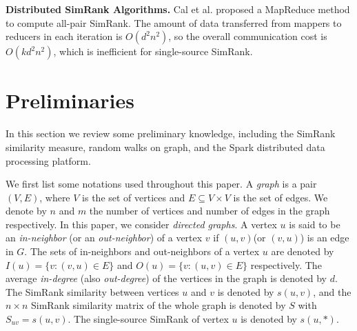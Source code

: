 \documentclass[conference]{IEEEtran}
\theoremstyle{definition}
\theoremstyle{definition}
\begin{document}
 \textbf{Distributed SimRank Algorithms. } 
Cal et al. \cite{cao2012delta} proposed a MapReduce method to compute all-pair SimRank. 
The amount of data transferred from mappers to reducers in each iteration is $O(d^2n^2)$, so the overall communication cost  is $O(kd^2n^2)$, which is inefficient  for single-source SimRank.

\section{Preliminaries}
In this section we review some preliminary knowledge, including the SimRank similarity measure, random walks on graph, and the Spark distributed data processing platform. 

We first list some notations used throughout this paper.
A \emph{graph} is a pair $(V, E)$, where $V$ is the set of vertices and $E \subseteq V \times V$ is the set of edges. 
We denote by $n$ and $m$ the number of vertices and number of edges in the graph respectively. 
In this paper, we consider {\em directed graphs}. 
A vertex $u$ is said to be an {\em in-neighbor} (or an {\em out-neighbor}) of a vertex $v$ if $(u, v)$(or $(v,u)$) is an edge in $G$.
 The sets of in-neighbors and out-neighbors of a vertex $u$ are denoted by $I(u)=\{v: (v, u) \in E\}$ and  $O(u)=\{v: (u, v) \in E\}$ respectively. 
The average {\em in-degree} (also {\em out-degree}) of the vertices in the graph is denoted by $d$.
The SimRank similarity between vertices $u$ and $v$ is denoted by $s(u, v)$, and the $n\times n$ SimRank similarity matrix of the whole graph is denoted by $S$ with $S_{uv}=s(u,v)$.
The single-source SimRank of vertex $u$ is denoted by $s(u,*)$. 
\end{document}
